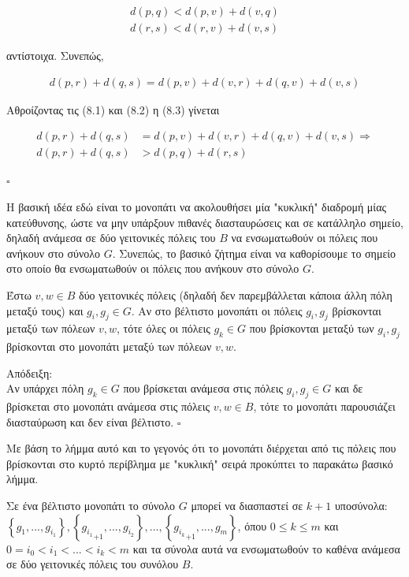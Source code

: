 \documentclass[oneside,12pt]{book}
\theoremstyle{definition}
\begin{document}
\begin{align}
	d(p,q) < d(p,v) + d(v,q) \\
	d(r,s) < d(r,v) + d(v,s)
\end{align}

αντίστοιχα. Συνεπώς,

\begin{align}
	d(p,r) + d(q,s) = d(p,v) + d(v,r) + d(q,v) + d(v,s)
\end{align}

Αθροίζοντας τις (8.1) και (8.2) η (8.3) γίνεται

\begin{align*}
	d(p,r) + d(q,s) &= d(p,v) + d(v,r) + d(q,v) + d(v,s) \Rightarrow \\
	d(p,r) + d(q,s) &> d(p,q) + d(r,s)
\end{align*}

\(\square\)

Η βασική ιδέα εδώ είναι το μονοπάτι να ακολουθήσει μία "κυκλική" διαδρομή μίας κατεύθυνσης, ώστε να μην υπάρξουν πιθανές διασταυρώσεις και σε κατάλληλο σημείο, δηλαδή ανάμεσα σε δύο γειτονικές πόλεις του \(B\) να ενσωματωθούν οι πόλεις που ανήκουν στο σύνολο \(G\). Συνεπώς, το βασικό ζήτημα είναι να καθορίσουμε το σημείο στο οποίο θα ενσωματωθούν οι πόλεις που ανήκουν στο σύνολο \(G\). \\

\begin{mylemma}{}{}
	Έστω \(v,w \in B\) δύο γειτονικές πόλεις (δηλαδή δεν παρεμβάλλεται κάποια άλλη πόλη μεταξύ τους) και \(g_i, g_j \in G\). Αν στο βέλτιστο μονοπάτι οι πόλεις \(g_i, g_j\) βρίσκονται μεταξύ των πόλεων \(v,w\), τότε όλες οι πόλεις \(g_k \in G\) που βρίσκονται μεταξύ των \(g_i, g_j\) βρίσκονται στο μονοπάτι μεταξύ των πόλεων \(v,w\).
\end{mylemma}

Απόδειξη: \\
Αν υπάρχει πόλη \(g_k \in G\) που βρίσκεται ανάμεσα στις πόλεις \(g_i, g_j \in G\) και δε βρίσκεται στο μονοπάτι ανάμεσα στις πόλεις \(v,w \in B\), τότε το μονοπάτι παρουσιάζει διασταύρωση και δεν είναι βέλτιστο. \(\square\)

Με βάση το λήμμα αυτό και το γεγονός ότι το μονοπάτι διέρχεται από τις πόλεις που βρίσκονται στο κυρτό περίβλημα με "κυκλική" σειρά προκύπτει το παρακάτω βασικό λήμμα. \\

\begin{mylemma}{}{}
	Σε ένα βέλτιστο μονοπάτι το σύνολο \(G\) μπορεί να διασπαστεί σε \(k+1\) υποσύνολα: \(\left\{g_1,...,g_{i_1}\right\}, \left\{{g_{i_1}}_{+1},...,g_{i_2}\right\},...,\left\{{g_{i_k}}_{+1},...,g_{m}\right\}\), όπου \(0 \leq k \leq m\) και \(0=i_0 < i_1 < ... < i_k < m\) και τα σύνολα αυτά να ενσωματωθούν το καθένα ανάμεσα σε δύο γειτονικές πόλεις του συνόλου \(B\).
\end{mylemma}
\end{document}
